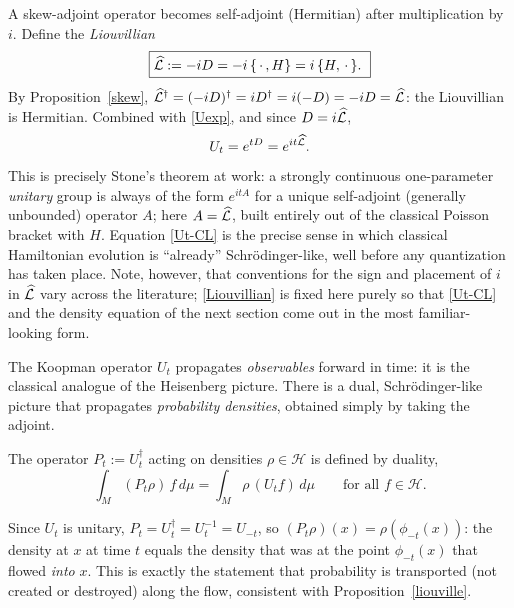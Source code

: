 A skew-adjoint operator becomes self-adjoint (Hermitian) after multiplication 
by $i$. Define the \emph{Liouvillian}
\begin{equation}
\boxed{\widehat{\mathcal{L}} := -i D = -i\,\{\,\cdot\,,H\} = i\,\{H,\,\cdot\,\}.\ }
\label{Liouvillian}
\end{equation}
By Proposition~\ref{skew}, $\widehat{\mathcal{L}}^\dagger=(-i D)^\dagger = i D^\dagger = 
i(-D)=-i D=\widehat{\mathcal{L}}$: the Liouvillian is Hermitian. Combined with \eqref{Uexp}, 
and since $D=i\widehat{\mathcal{L}}$,
\begin{equation}
U_t = e^{tD} = e^{i t\widehat{\mathcal{L}}}.
\label{Ut-CL}
\end{equation}
This is precisely Stone's theorem \cite{stone} at work: a strongly continuous
one-parameter \emph{unitary} group is always of the form $e^{i t A}$ for a
unique self-adjoint (generally unbounded) operator $A$; here $A=\widehat{\mathcal{L}}$, built
entirely out of the classical Poisson bracket with $H$. Equation \eqref{Ut-CL}
is the precise sense in which classical Hamiltonian evolution is ``already''
Schr\"odinger-like, well before any quantization has taken place. Note,
however, that conventions for the sign and placement of $i$ in $\widehat{\mathcal{L}}$ vary
across the literature; \eqref{Liouvillian} is fixed here purely so that
\eqref{Ut-CL} and the density equation of the next section come out in the most
familiar-looking form.


The Koopman operator $U_t$ propagates \emph{observables} forward in time: it is
the classical analogue of the Heisenberg picture. There is a dual,
Schr\"odinger-like picture that propagates \emph{probability densities},
obtained simply by taking the adjoint.

\begin{definition}
The operator $P_t := U_t^\dagger$ acting on densities 
    $\rho\in\mathcal H$ is defined by duality,
\begin{equation}
\int_M (P_t\rho)\,f\,d\mu = \int_M \rho\,(U_tf)\,d\mu 
    \qquad \text{for all } f\in\mathcal H.
\end{equation}
\end{definition}

Since $U_t$ is unitary, $P_t = U_t^\dagger = U_t^{-1}=U_{-t}$, so $(P_t\rho)(x)
= \rho(\phi_{-t}(x))$: the density at $x$ at time $t$ equals the density that
was at the point $\phi_{-t}(x)$ that flowed \emph{into} $x$. This is exactly
the statement that probability is transported (not created or destroyed) along
the flow, consistent with Proposition~\ref{liouville}.

